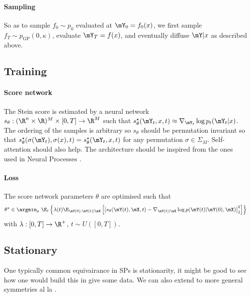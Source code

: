 \paragraph{Sampling}
So as to sample $f_0 \sim p_0$ evaluated at $\mY_0=f_0(x)$, we first sample $f_T \sim p_{\text{GP}}(0, \kappa)$, evaluate $\mY_T = f(x)$, and eventually diffuse $\mY|x$ as described above.

\subsection{Training}

\paragraph{Score network}
The Stein score is estimated by a neural network $s_\theta: (\R^n \times \R)^M \times [0,T] \rightarrow \R^M$ such that $s_\theta^\star(\mY_t, x, t) \approx \nabla_{\mY_t} \log p_t(\mY_t|x)$.
The ordering of the samples is arbitrary so $s_\theta$ should be permutation invariant so that $s_\theta^\star(\sigma(\mY_t), \sigma(x), t) = s_\theta^\star(\mY_t, x, t)$ for any permutation $\sigma \in \Sigma_M$.
Self-attention should also help.
The architecture should be inspired from the ones used in Neural Processes \cite{garnelo2018conditional,garnelo2018neural}.


\paragraph{Loss}
The score network parameters $\theta$ are optimised such that
\begin{align}
\theta^\star \in \argmin_\theta ~\E_t \left\{ \lambda(t) \E_{\mY(0),\mY(t)|\mX} \left[ \left| s_\theta(\mY(t),\mX,t) - \nabla_{\mY(t)|\mX} \log p(\mY(t)|\mY(0),\mX) \right|^2_2  \right] \right\}
\end{align}
with $\lambda: [0,T] \rightarrow \R^+$, $t \sim U([0, T])$.

\subsection{Stationary}

One typically common equivairance in SPs is stationarity, it might be good to see how one would build this in give some data. We can also extend to more general symmetries al la \cite{holderrieth2021equivariant}. 

